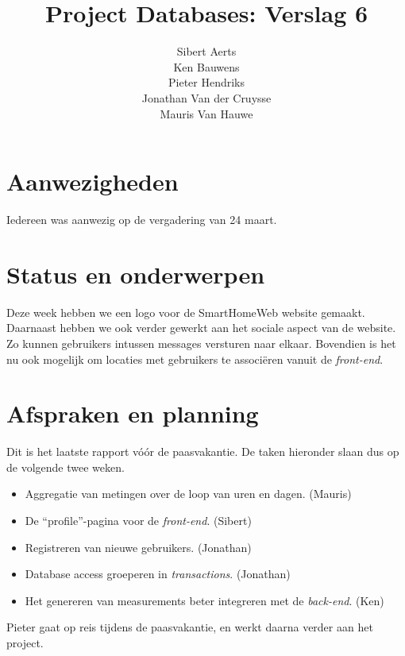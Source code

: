 \documentclass[10pt,a4paper]{article}
\author{Sibert Aerts\\
Ken Bauwens\\
Pieter Hendriks\\
Jonathan Van der Cruysse\\
Mauris Van Hauwe}
\title{Project Databases: Verslag 6}
\date{}
\begin{document}
  \maketitle
  \section{Aanwezigheden}
  Iedereen was aanwezig op de vergadering van 24 maart. 
  
  \section{Status en onderwerpen}
  Deze week hebben we een logo voor de SmartHomeWeb website gemaakt. Daarnaast hebben we ook verder gewerkt aan het sociale aspect van de website. Zo kunnen gebruikers intussen messages versturen naar elkaar. Bovendien is het nu ook mogelijk om locaties met gebruikers te associ\"eren vanuit de \emph{front-end}.
  
  \section{Afspraken en planning}
  Dit is het laatste rapport v\'o\'or de paasvakantie. De taken hieronder slaan dus op de volgende twee weken.
  
  \begin{itemize}
  	\item Aggregatie van metingen over de loop van uren en dagen. (Mauris)
  	
  	\item De ``profile''-pagina voor de \emph{front-end}. (Sibert)
  	
  	\item Registreren van nieuwe gebruikers. (Jonathan)
  	
  	\item Database access groeperen in \emph{transactions}. (Jonathan)
  	
  	\item Het genereren van measurements beter integreren met de \emph{back-end}. (Ken)
  	
  \end{itemize}
  
  Pieter gaat op reis tijdens de paasvakantie, en werkt daarna verder aan het project.
  
\end{document}
